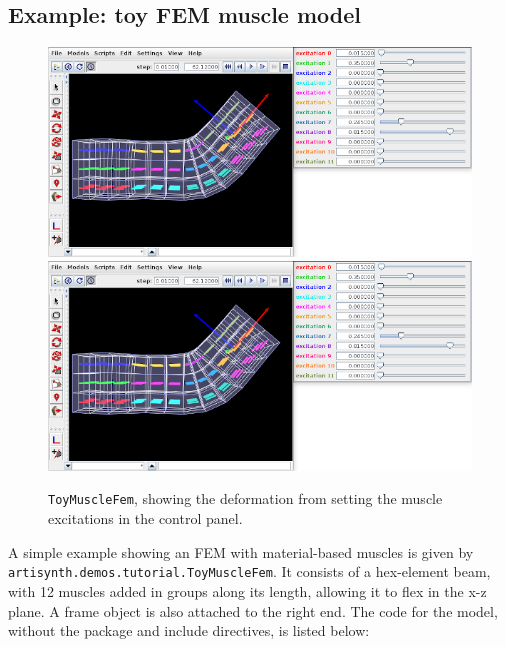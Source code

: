 \subsection{Example: toy FEM muscle model}
\label{ToyMuscleFem:sec}

\begin{figure}[ht]
\begin{center}
\iflatexml
   \includegraphics[]{images/ToyMuscleFem}
\else
   \includegraphics[width=6in]{images/ToyMuscleFem}
\fi
\end{center}
\caption{{\tt ToyMuscleFem}, showing the deformation from setting
the muscle excitations in the control panel.}
\label{ToyMuscleFem:fig}
\end{figure}

A simple example showing an FEM with material-based muscles is given by {\tt
artisynth.demos.tutorial.ToyMuscleFem}. It consists of a hex-element beam, with
12 muscles added in groups along its length, allowing it to flex in the x-z
plane. A frame object is also attached to the right end. The code for the
model, without the package and include directives, is listed below:
%
\lstset{numbers=left}
\iflatexml

\else

\fi
\lstset{numbers=none}
%

